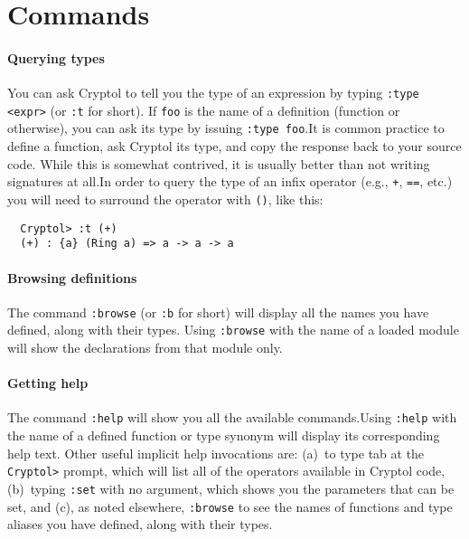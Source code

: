 
\section{Commands}
\label{sec:commands}

\paragraph*{Querying types}
You can ask Cryptol to tell you the type of an expression by typing
{\tt :type <expr>} (or {\tt :t} for short). If {\tt foo} is the name
of a definition (function or otherwise), you can ask its type by
issuing {\tt :type foo}.\indCmdType It is common practice to define a
function, ask Cryptol its type, and copy the response back to your
source code.  While this is somewhat contrived, it is usually better
than not writing signatures at all.\indSignature In order to query the
type of an infix operator (e.g., {\tt +}, {\tt ==}, etc.)  you will need
to surround the operator with {\tt ()}, like this:
\begin{Verbatim}
  Cryptol> :t (+)
  (+) : {a} (Ring a) => a -> a -> a
\end{Verbatim}

\paragraph*{Browsing definitions}
The command {\tt :browse} (or {\tt :b} for short) will display all the
names you have defined, along with their types.\indCmdBrowse
Using \texttt{:browse} with the name of a loaded module will show
the declarations from that module only.

\paragraph*{Getting help}
The command {\tt :help} will show you all the available
commands.\indCmdHelp Using \texttt{:help} with the name of a defined
function or type synonym will display its corresponding help text.
Other useful implicit help invocations are: (a)~to type tab at the
{\tt Cryptol>} prompt, which will list all of the operators available
in Cryptol code, (b)~typing {\tt :set} with no argument, which shows
you the parameters that can be set, and (c), as noted elsewhere,
\texttt{:browse} to see the names of functions and type aliases you
have defined, along with their types.

